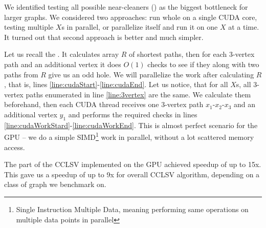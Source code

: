 

We identified testing all possible near-cleaners () as the biggest bottleneck for larger graphs. We considered two approaches: run whole  on a single CUDA core, testing multiple $X$s in parallel, or parallelize  itself and run it on one $X$ at a time. It turned out that second approach is better and much simpler.

Let us recall the . It calculates array $R$ of shortest paths, then for each 3-vertex path and an additional vertex it does $O(1)$ checks to see if they along with two paths from $R$ give us an odd hole. We will parallelize the work after calculating $R$, that is, lines \ref{line:cudaStart}-\ref{line:cudaEnd}. Let us notice, that for all $X$s, all 3-vertex paths enumerated in line \ref{line:3vertex} are the same. We calculate them beforehand, then each CUDA thread receives one 3-vertex path $x_1$-$x_2$-$x_3$ and an additional vertex $y_1$ and performs the required checks in lines \ref{line:cudaWorkStard}-\ref{line:cudaWorkEnd}. This is almost perfect scenario for the GPU -- we do a simple SIMD\footnote{Single Instruction Multiple Data, meaning performing same operations on multiple data points in parallel} work in parallel, without a lot scattered memory access.

The part of the CCLSV implemented on the GPU achieved speedup of up to 15x. This gave us a speedup of up to 9x for overall CCLSV algorithm, depending on a class of graph we benchmark on.

